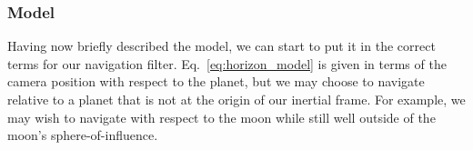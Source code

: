 \documentclass[12pt]{article}
\newcommand{\Tf}[2]{\ensuremath{\mathrm{T}_{#1}^{#2}}}
\begin{document}
\subsubsection{Model}
Having now briefly described the model, we can start to put it in the correct terms for our navigation filter. Eq.~\ref{eq:horizon_model} is given in terms of the camera position with respect to the planet, but we may choose to navigate relative to a planet that is not at the origin of our inertial frame. For example, we may wish to navigate with respect to the moon while still well outside of the moon's sphere-of-influence.





\end{document}
